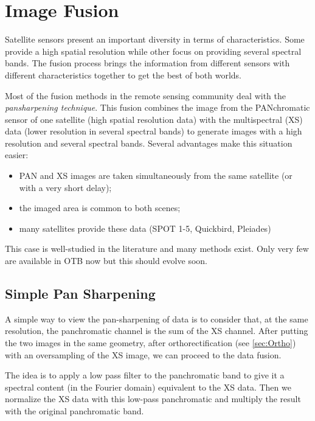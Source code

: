
\chapter{Image Fusion }\label{sec:Fusion}

Satellite sensors present an important diversity in terms of characteristics.
Some provide a high spatial resolution while other focus on providing several
spectral bands. The fusion process brings the information from different
sensors with different characteristics together to get the best of both
worlds.

Most of the fusion methods in the remote sensing community deal with
the {\em pansharpening technique}. This fusion combines the image from
the PANchromatic sensor of one satellite (high spatial resolution
data) with the multispectral (XS) data (lower resolution in several
spectral bands) to generate images with a high resolution and several
spectral bands. Several advantages make this situation easier:

\begin{itemize}
\item PAN and XS images are taken simultaneously from the same satellite (or
with a very short delay);
\item the imaged area is common to both scenes;
\item many satellites provide these data (SPOT 1-5, Quickbird, Pleiades)
\end{itemize}

This case is well-studied in the literature and many methods exist. Only very
few are available in OTB now but this should evolve soon.


\section{Simple Pan Sharpening}\label{secPanSharpening}

A simple way to view the pan-sharpening of data is to consider that, at the same resolution,  the panchromatic channel is the sum of the XS channel. After putting the two images in the same geometry, after orthorectification (see \ref{sec:Ortho}) with an oversampling of the XS image, we can proceed to the data fusion. 

The idea is to apply a low pass filter to the panchromatic band to give it a spectral content (in the Fourier domain) equivalent to the XS data. Then we normalize the XS data with this low-pass panchromatic and multiply the result with the original panchromatic band.

